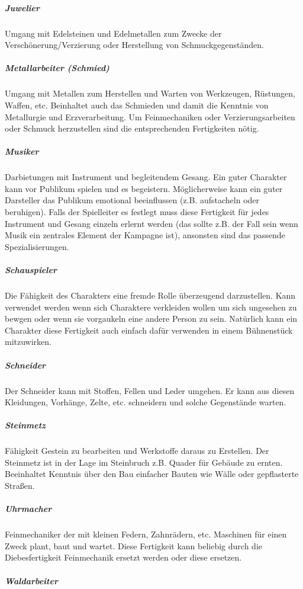 \documentclass{article}
\begin{document}
\subparagraph{Juwelier}

Umgang mit Edelsteinen und Edelmetallen zum Zwecke der Verschönerung/Verzierung oder Herstellung von
Schmuckgegenständen.

\subparagraph{Metallarbeiter (Schmied)}

Umgang mit Metallen zum Herstellen und Warten von Werkzeugen, Rüstungen, Waffen, etc. Beinhaltet auch das Schmieden
und damit die Kenntnis von Metallurgie und Erzverarbeitung. Um Feinmechaniken oder Verzierungsarbeiten oder Schmuck
herzustellen sind die entsprechenden Fertigkeiten nötig.

\subparagraph{Musiker}

Darbietungen mit Instrument und begleitendem Gesang. Ein guter Charakter kann vor Publikum spielen und es
begeistern. Möglicherweise kann ein guter Darsteller das Publikum emotional beeinflussen (z.B. aufstacheln oder
beruhigen). Falls der Spielleiter es festlegt muss diese Fertigkeit für jedes Instrument und Gesang einzeln erlernt
werden (das sollte z.B. der Fall sein wenn Musik ein zentrales Element der Kampagne ist), ansonsten sind das
passende Spezialisierungen.

\subparagraph{Schauspieler}

Die Fähigkeit des Charakters eine fremde Rolle überzeugend darzustellen. Kann verwendet werden wenn sich Charaktere
verkleiden wollen um sich ungesehen zu bewgen oder wenn sie vorgaukeln eine andere Person zu sein. Natürlich kann
ein Charakter diese Fertigkeit auch einfach dafür verwenden in einem Bühnenstück mitzuwirken.

\subparagraph{Schneider}

Der Schneider kann mit Stoffen, Fellen und Leder umgehen. Er kann aus diesen Kleidungen, Vorhänge, Zelte, etc.
schneidern und solche Gegenstände warten.

\subparagraph{Steinmetz}

Fähigkeit Gestein zu bearbeiten und Werkstoffe daraus zu Erstellen. Der Steinmetz ist in der Lage im Steinbruch z.B.
Quader für Gebäude zu ernten. Beeinhaltet Kenntnis über den Bau einfacher Bauten wie Wälle oder gepflasterte
Straßen.

\subparagraph{Uhrmacher}

Feinmechaniker der mit kleinen Federn, Zahnrädern, etc. Maschinen für einen Zweck plant, baut und wartet. Diese
Fertigkeit kann beliebig durch die Diebesfertigkeit Feinmechanik ersetzt werden oder diese ersetzen.

\subparagraph{Waldarbeiter}
\end{document}
